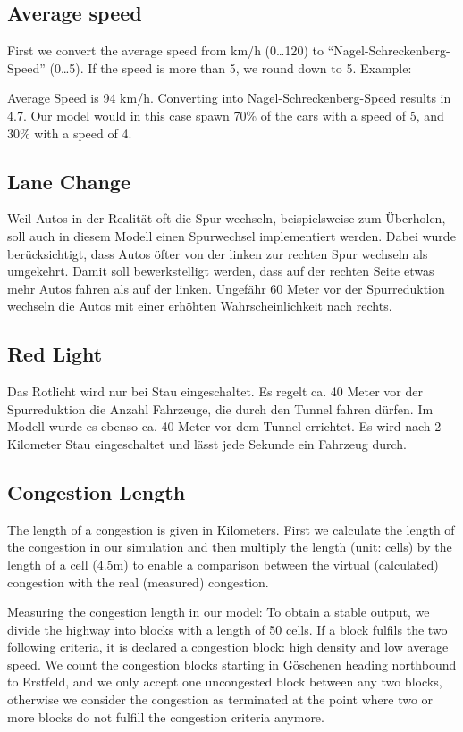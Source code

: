 \subsection{Average speed}
First we convert the average speed from km/h (0\ldots 120) to “Nagel-Schreckenberg-Speed” (0\ldots 5). If the speed is more than 5, we round down to 5.
Example:

Average Speed is 94 km/h. Converting into Nagel-Schreckenberg-Speed results in 4.7. Our model would in this case spawn 70\% of the cars with a speed of 5, and 30\% with a speed of 4.

\subsection{Lane Change}
Weil Autos in der Realität oft die Spur wechseln, beispielsweise zum Überholen, soll auch in diesem Modell einen Spurwechsel implementiert werden. Dabei wurde berücksichtigt, dass Autos  öfter von der linken zur rechten Spur wechseln als umgekehrt. Damit soll bewerkstelligt werden, dass auf der rechten Seite etwas mehr Autos fahren als auf der linken. Ungefähr 60 Meter vor der Spurreduktion wechseln die Autos mit einer erhöhten Wahrscheinlichkeit nach rechts.

\subsection{Red Light}
Das Rotlicht wird nur bei Stau eingeschaltet. Es regelt ca. 40 Meter vor der Spurreduktion die Anzahl Fahrzeuge, die durch den Tunnel fahren dürfen. Im Modell wurde es ebenso ca. 40 Meter vor dem Tunnel errichtet. Es wird nach 2 Kilometer Stau eingeschaltet und lässt jede Sekunde ein Fahrzeug durch.


\subsection{Congestion Length}
The length of a congestion is given in Kilometers. First we calculate the length of the congestion in our simulation and then multiply the length (unit: cells) by the length of a cell (4.5m) to enable a comparison between the virtual (calculated) congestion with the real (measured) congestion.

Measuring the congestion length in our model: To obtain a stable output, we divide the highway into blocks with a length of 50 cells. If a block fulfils the two following criteria, it is declared a congestion block: high density and low average speed. We count the congestion blocks starting in Göschenen heading northbound to Erstfeld, and we only accept one uncongested block between any two blocks, otherwise we consider the congestion as terminated at the point where two or more blocks do not fulfill the congestion criteria anymore.


